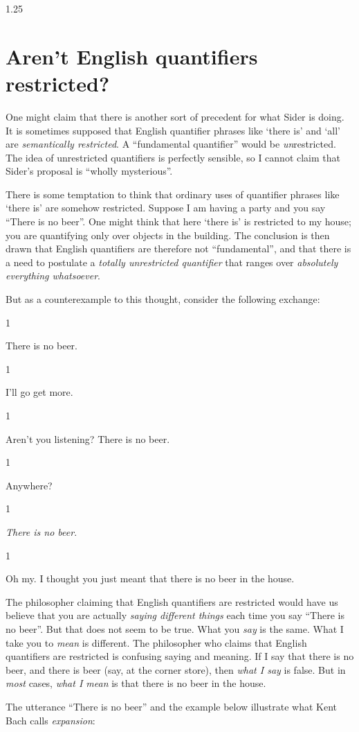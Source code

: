 \documentclass[12pt,twoside]{reedfancy}
\newcommand{\stage}[3]%
{%
	\begin{spacing}{1}%
	\vspace{0pt}
		\begin{description}[style=nextline, parsep=0pt,
                    leftmargin=15mm, itemindent=-10mm, font=\mdseries]
			\item[\textsc{#1} \emph{#2}] #3
		\end{description}%
	\end{spacing}%
}
\begin{document}
\begin{spacing}{1.25}
\section{Aren't English quantifiers restricted?}
\label{eng-quant}
One might claim that there is another sort of precedent for what Sider
is doing.  It is sometimes supposed that English quantifier phrases
like `there is' and `all' are {\em semantically restricted}.  A
``fundamental quantifier'' would be {\em un}restricted.  The idea of
unrestricted quantifiers is perfectly sensible, so I cannot claim that
Sider's proposal is ``wholly mysterious''.

There is some temptation to think that ordinary uses of quantifier
phrases like `there is' are somehow restricted.  Suppose I am having a
party and you say ``There is no beer''.  One might think that here
`there is' is restricted to my house; you are quantifying only over
objects in the building.  The conclusion is then drawn that English
quantifiers are therefore not ``fundamental'', and that there is a
need to postulate a {\em totally unrestricted quantifier} that ranges
over {\em absolutely everything whatsoever}.

But as a counterexample to this thought, consider the following
exchange:

\stage{You}{}{There is no beer.}

\stage{Me}{}{I'll go get more.}

\stage{You}{}{Aren't you listening?  There is no beer.}

\stage{Me}{}{Anywhere?}

\stage{You}{}{{\em There is no beer}.}

\stage{Me}{}{Oh my.  I thought you just meant that there is no beer in
  the house.}

The philosopher claiming that English quantifiers are restricted would
have us believe that you are actually {\em saying different things}
each time you say ``There is no beer''.  But that does not seem to be
true.  What you {\em say} is the same.  What I take you to {\em mean}
is different.  The philosopher who claims that English quantifiers are
restricted is confusing saying and meaning.  If I say that there is no
beer, and there is beer (say, at the corner store), then {\em what I
  say} is false.  But in {\em most} cases, {\em what I mean} is that
there is no beer in the house.

The utterance ``There is no beer'' and the example below illustrate
what Kent Bach calls {\em expansion}:


\end{spacing}
\end{document}

